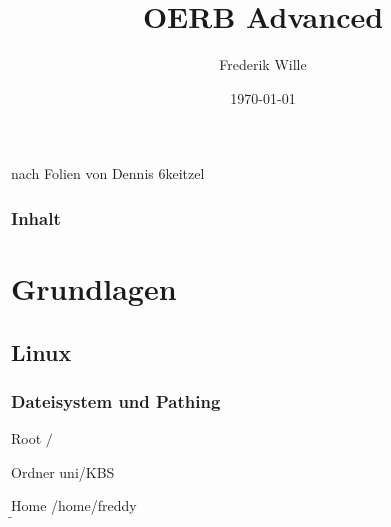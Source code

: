 \documentclass{beamer}
\begin{document}
    \title{OERB Advanced}
    \author{Frederik Wille}

    \date{\today}

    \begin{frame}
        \titlepage
        {\tiny nach Folien von Dennis 6keitzel}
    \end{frame}

    \begin{frame}
        \frametitle{Inhalt}
        \tableofcontents
    \end{frame}

    \section{Grundlagen}
    \subsection{Linux}
    \begin{frame}
        \frametitle{Dateisystem und Pathing}
        \begin{block}{Root}
            $/$
        \end{block}
        \begin{block}{Ordner}
            uni/KBS
        \end{block}
        \begin{block}{Home}
            /home/freddy \\
            $\tilde \ $
        \end{block}
    \end{frame}
\end{document}
